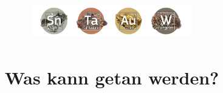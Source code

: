 \documentclass[a4paper,11pt]{article}
\title{
  \includegraphics[width=7cm]{images/banner-minerals}\\[\bigskipamount]
  \documenttitle\\[\bigskipamount]
  \large Was kann getan werden?
}
\author{\documentauthors}
\date{\parbox{\linewidth}{\centering%
  Datum \documentdate\endgraf
}}
\begin{document}
\maketitle\thispagestyle{empty}\newpage

\begin{abstract}
  
          \newpage
\end{abstract}









\end{document}
